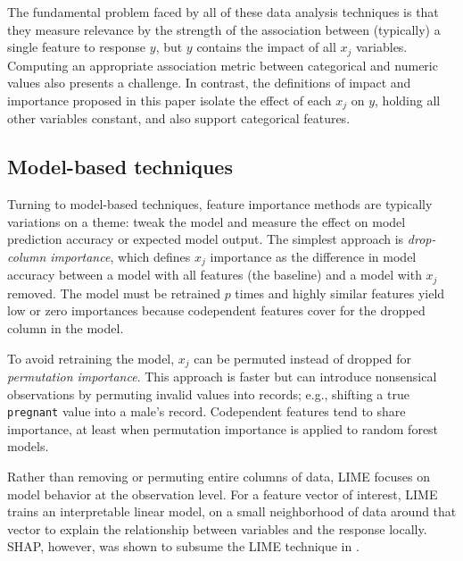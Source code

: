 \documentclass[11pt]{article}
\begin{document}
The fundamental problem faced by all of these data analysis techniques is that they measure relevance by the strength of the association between (typically) a single feature to response $y$, but $y$ contains the impact of all $x_j$ variables. Computing an appropriate association metric between categorical and numeric values also presents a challenge.  In contrast, the definitions of impact and importance proposed in this paper isolate the effect of each $x_j$ on $y$, holding all other variables constant, and also support categorical features.

\subsection{Model-based techniques}

Turning to model-based techniques, feature importance methods are typically variations on a theme: tweak the model and measure the effect on model prediction accuracy or expected model output. The simplest approach is {\em drop-column importance}, which defines $x_j$ importance as the difference in model accuracy between a model with all features (the baseline) and a model with $x_j$ removed. The model must be retrained $p$ times and highly similar features yield low or zero importances because codependent features cover for the dropped column in the model.

To avoid retraining the model, $x_j$ can be permuted instead of dropped for {\em permutation importance}. This approach is faster but can introduce nonsensical observations by permuting invalid values into records; e.g., shifting a true {\tt\small pregnant} value into a male's record. Codependent features tend to share importance, at least when permutation importance is applied to random forest models.

Rather than removing or permuting entire columns of data, LIME \citep{lime} focuses on model behavior at the observation level. For a feature vector of interest, LIME trains an interpretable linear model, on a small neighborhood of data around that vector to explain the relationship between variables and the response locally. SHAP, however, was shown to subsume the LIME technique in \citep{shap}. 
\end{document}
